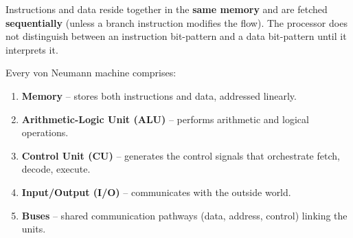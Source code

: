 \documentclass[11pt]{article}
\begin{document}
\begin{definition}
Instructions and data reside together in the \textbf{same memory} and are fetched \textbf{sequentially} (unless a branch instruction modifies the flow). The processor does not distinguish between an instruction bit-pattern and a data bit-pattern until it interprets it.
\end{definition}

\begin{propriete}
Every von Neumann machine comprises:
\begin{enumerate}
\item \textbf{Memory} -- stores both instructions and data, addressed linearly.
\item \textbf{Arithmetic-Logic Unit (ALU)} -- performs arithmetic and logical operations.
\item \textbf{Control Unit (CU)} -- generates the control signals that orchestrate fetch, decode, execute.
\item \textbf{Input/Output (I/O)} -- communicates with the outside world.
\item \textbf{Buses} -- shared communication pathways (data, address, control) linking the units.
\end{enumerate}
\end{propriete}
\end{document}

